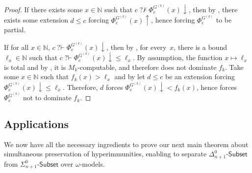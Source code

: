 \documentclass{article}
\def\NN{\mathbb{N}}
\def\WW{\mathbb{W}}
\newcommand{\converge}{\!\!\downarrow}
\newcommand{\diverge}{\!\!\uparrow}
\newcommand{\qvdash}{\operatorname{{?}{\vdash}}}
\newcommand{\nqvdash}{\operatorname{{?}{\nvdash}}}
\newcommand{\Sub}[1]{{#1}\mbox{-}\mathsf{Subset}}
\numberwithin{theorem}{section}
\newtheorem{lemma}[theorem]{Lemma}
\theoremstyle{definition}
\begin{document}


\begin{proof}
If there exists some $x \in \NN$ such that $c \nqvdash \Phi_e^{G^{(k)}}(x) \converge$, then by , there exists some extension $d \leq c$ forcing $\Phi_e^{G^{(k)}}(x) \diverge$, hence forcing $\Phi_e^{G^{(k)}}$ to be partial.

If for all $x \in \NN$, $c \qvdash \Phi_e^{G^{(k)}}(x)\converge$, then by , for every~$x$, there is a bound $\ell_x \in \NN$ such that $c \qvdash \Phi_e^{G^{(k)}}(x) \converge \leq \ell_x$. By assumption, the function $x \mapsto \ell_x$ is total and by , it is $M_{k}$-computable, and therefore does not dominate $f_{k}$. Take some $x \in \NN$ such that $f_{k}(x) > \ell_x$ and by  let $d \leq c$ be an extension forcing $\Phi_e^{G^{(k)}}(x) \converge \leq \ell_x$. Therefore, $d$ forces $\Phi_e^{G^{(k)}}(x) \converge < f_{k}(x)$, hence forces $\Phi_e^{G^{(k)}}$ not to dominate $f_{k}$.      
\end{proof}


\subsection{Applications}\label{sect:preservation-apps}

We now have all the necessary ingredients to prove our next main theorem about simultaneous preservation of hyperimmunities, enabling to separate $\Sub{\Delta^0_{n+1}}$ from $\Sub{\Sigma^0_{n+1}}$ over $\omega$-models.
\end{document}

